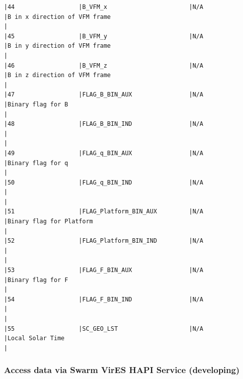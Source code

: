 \begin{verbatim}
|44                  |B_VFM_x                       |N/A                           |B in x direction of VFM frame                                                                       |
|45                  |B_VFM_y                       |N/A                           |B in y direction of VFM frame                                                                       |
|46                  |B_VFM_z                       |N/A                           |B in z direction of VFM frame                                                                       |
|47                  |FLAG_B_BIN_AUX                |N/A                           |Binary flag for B                                                                                   |
|48                  |FLAG_B_BIN_IND                |N/A                           |                                                                                                    |
|49                  |FLAG_q_BIN_AUX                |N/A                           |Binary flag for q                                                                                   |
|50                  |FLAG_q_BIN_IND                |N/A                           |                                                                                                    |
|51                  |FLAG_Platform_BIN_AUX         |N/A                           |Binary flag for Platform                                                                            |
|52                  |FLAG_Platform_BIN_IND         |N/A                           |                                                                                                    |
|53                  |FLAG_F_BIN_AUX                |N/A                           |Binary flag for F                                                                                   |
|54                  |FLAG_F_BIN_IND                |N/A                           |                                                                                                    |
|55                  |SC_GEO_LST                    |N/A                           |Local Solar Time                                                                                    |
\end{verbatim}

\subsubsection{Access data via Swarm VirES HAPI Service (developing)}\label{swarm-hapi}

